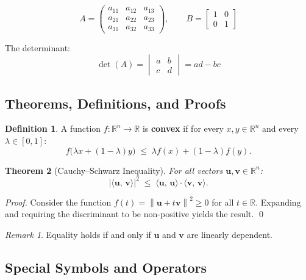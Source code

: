 \documentclass[12pt, a4paper]{article}
\theoremstyle{definition}
\newtheorem{definition}{Definition}[section]
\theoremstyle{plain}
\newtheorem{theorem}[definition]{Theorem}
\theoremstyle{remark}
\newtheorem*{remark}{Remark}
\newcommand{\R}{\mathbb{R}}             %
\newcommand{\norm}[1]{\left\|#1\right\|}   %
\newcommand{\innerp}[2]{\langle #1,\, #2\rangle}  %
\begin{document}
\[
  A = \begin{pmatrix}           %
    a_{11} & a_{12} & a_{13} \\
    a_{21} & a_{22} & a_{23} \\
    a_{31} & a_{32} & a_{33}
  \end{pmatrix},
  \qquad
  B = \begin{bmatrix}           %
    1 & 0 \\
    0 & 1
  \end{bmatrix}
\]

The determinant:
\[
  \det(A) = \begin{vmatrix}     %
    a & b \\ c & d
  \end{vmatrix} = ad - bc
\]

\subsection{Theorems, Definitions, and Proofs}

\begin{definition}
  A function $f: \R^n \to \R$ is \textbf{convex} if for every
  $x, y \in \R^n$ and every $\lambda \in [0,1]$:
  \[
    f\bigl(\lambda x + (1-\lambda)y\bigr)
    \;\leq\;
    \lambda f(x) + (1-\lambda)f(y).
  \]
\end{definition}

\begin{theorem}[Cauchy–Schwarz Inequality]
  For all vectors $\mathbf{u}, \mathbf{v} \in \R^n$:
  \[
    \bigl|\innerp{\mathbf{u}}{\mathbf{v}}\bigr|^2
    \;\leq\;
    \innerp{\mathbf{u}}{\mathbf{u}} \cdot \innerp{\mathbf{v}}{\mathbf{v}}.
  \]
\end{theorem}

\begin{proof}
  Consider the function $f(t) = \norm{\mathbf{u} + t\mathbf{v}}^2 \geq 0$
  for all $t \in \R$.  Expanding and requiring the discriminant to be
  non-positive yields the result. \qed
\end{proof}

\begin{remark}
  Equality holds if and only if $\mathbf{u}$ and $\mathbf{v}$ are linearly
  dependent.
\end{remark}

\subsection{Special Symbols and Operators}
\end{document}
